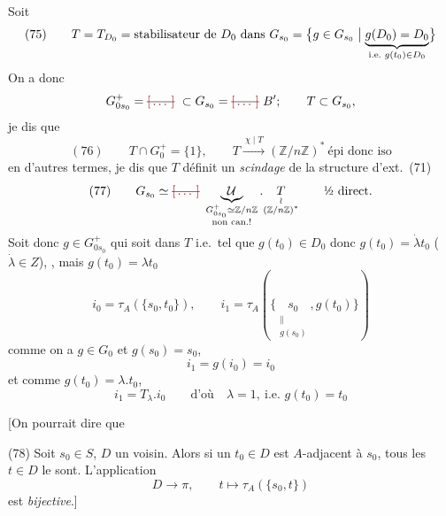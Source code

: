 \documentclass[11pt,a4paper]{article}
\begin{document}
Soit
\[
(75) \qquad T = T_{D_0} = \text{stabilisateur de } D_0 \text{ dans } G_{s_0} = \bigl\{ g \in G_{s_0} \bigm| \underbrace{g(D_0) = D_0}_{\text{i.e.\ } g(t_0) \in D_0} \bigr\}
\]
 On a donc
\[
G^{+}_{0 s_0} = \text{\struck{\ill{}}}\ \subset G_{s_0} = \text{\struck{\ill{}}}\ B' ; \qquad T \subset G_{s_0} ,
\]
 je dis que
\[
(76) \qquad T \cap G_0^{+} = \{1\}, \qquad T \xrightarrow{\ \chi \mid T\ } (\mathbb{Z}/n\mathbb{Z})^{*} \ \text{épi donc iso}
\]
en d'autres termes, je dis que $T$ définit un \emph{scindage} de la structure d'ext.\ (71)
\[
(77) \qquad G_{s_0} \simeq \text{\struck{\ill{}}}\ \underbrace{\mathcal{U}}_{\substack{G^{+}_{0 s_0} \simeq \mathbb{Z}/n\mathbb{Z} \\ \text{non can.!}}} . \underset{\substack{\wr \\ (\mathbb{Z}/n\mathbb{Z})^{*}}}{T} \qquad \text{½ direct} .
\]
Soit donc $g \in G^{+}_{0 s_0}$ qui soit dans $T$ i.e.\ tel que $g(t_0) \in D_0$ donc $g(t_0) = \dot\lambda t_0$ ($\dot\lambda \in Z$),   , mais $g(t_0) = \lambda t_0$   \add{\ill{}} 
\[
i_0 = \tau_A(\{s_0, t_0\}), \qquad i_1 = \tau_A(\{\underset{\substack{\parallel \\ g(s_0)}}{s_0}, g(t_0)\})
\]
comme on a $g \in G_0$ et $g(s_0) = s_0$, \ill{} \ill{} \ill{}
\[
i_1 = g(i_0) = i_0
\]
et comme $g(t_0) = \lambda . t_0$, \ill{}
\[
i_1 = T_\lambda . i_0 \qquad \text{d'où} \quad \lambda = 1, \ \text{i.e.\ } g(t_0) = t_0
\]
\struck{[\ill{} \ill{} \ill{} \ill{} : deux points $A$-adjacents} \struck{\ill{} d'un voyage, \ill{} \ill{} \ill{} \ill{}] \ill{} \ill{} \ill{} \ill{}}

[On pourrait dire que

(78) Soit $s_0 \in S$, $D$ un voisin. Alors si un $t_0 \in D$ est $A$-adjacent à $s_0$, tous les $t \in D$ le sont. L'application
\[
D \longrightarrow \pi, \qquad t \longmapsto \tau_A(\{s_0, t\})
\]
est \emph{bijective}.]
\end{document}
